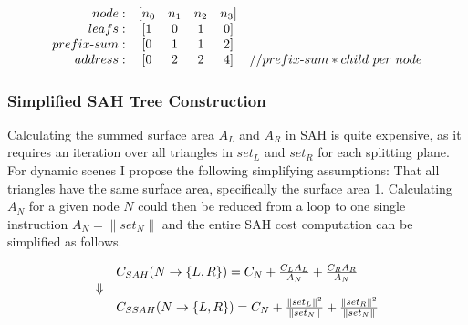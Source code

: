 \begin{displaymath}
  \begin{array}{r c c c c l}
    node: & [n_0 & n_1 & n_2 & n_3]\\
    leafs: & [1 & 0 & 1 & 0]\\
    prefix\text{-}sum: & [0 & 1 & 1 & 2]\\
    address: & [0 & 2 & 2 & 4] & // prefix\text{-}sum * child\text{ }per\text{ } node\\
  \end{array}
\end{displaymath}

\subsubsection{Simplified SAH Tree Construction}


Calculating the summed surface area $A_L$ and $A_R$ in SAH is quite
expensive, as it requires an iteration over all triangles in $set_L$
and $set_R$ for each splitting plane. For dynamic scenes I propose the
following simplifying assumptions: That all triangles have the same
surface area, specifically the surface area 1. Calculating $A_N$ for a
given node $N$ could then be reduced from a loop to one single
instruction $A_N = \|set_N\|$ and the entire SAH cost computation can
be simplified as follows.

\begin{displaymath}
  \begin{array}{r l}
    & C_{SAH}(N \rightarrow \{L, R\}) = C_N + \frac{C_L A_L}{A_N} + \frac{C_R
      A_R}{A_N}\\
    \Downarrow \\
    & C_{SSAH}(N \rightarrow \{L, R\}) = C_N +
    \frac{\|set_L\|^2}{\|set_N\|} + \frac{\|set_R\|^2}{\|set_N\|}\\
  \end{array}
\end{displaymath}


